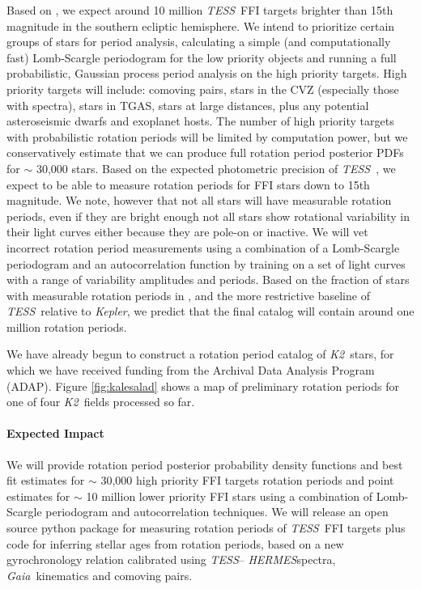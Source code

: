 \documentclass[letterpaper,12pt,preprint]{hack_aastex}
\newcommand{\Kepler}{{\it Kepler}}
\newcommand{\kepler}{\Kepler}
\newcommand{\Ktwo}{{\it K2}}
\newcommand{\ktwo}{\Ktwo}
\newcommand{\TESS}{{\it TESS}}
\newcommand{\tess}{{\it TESS}}
\newcommand{\Gaia}{{\it Gaia}}
\newcommand{\HERMES}{{\it HERMES}}
\begin{document}
Based on \citet{sullivan2015}, we expect around 10 million \TESS\ FFI
targets brighter than 15th magnitude in the southern ecliptic hemisphere.
We intend to prioritize certain groups of stars for period analysis,
calculating a simple (and computationally fast) Lomb-Scargle periodogram for
the low priority objects and running a full probabilistic, Gaussian process
period analysis on the high priority targets.
High priority targets will include: comoving pairs, stars in the CVZ
(especially those with spectra), stars in TGAS, stars at large distances, plus
any potential asteroseismic dwarfs and exoplanet hosts.
The number of high priority targets with probabilistic rotation periods will
be limited by computation power, but we conservatively estimate that we can
produce full rotation period posterior PDFs for $\sim$ 30,000 stars.
Based on the expected photometric precision of \tess\ \citep{sullivan2015}, we
expect to be able to measure rotation periods for FFI stars down to 15th
magnitude.
We note, however that not all stars will have measurable rotation periods,
even if they are bright enough not all stars show rotational variability in
their light curves either because they are pole-on or inactive.
We will vet incorrect rotation period measurements using a combination of a
Lomb-Scargle periodogram and an autocorrelation function by
training on a set of light curves with a range of variability amplitudes and
periods.
Based on the fraction of stars with measurable rotation periods in
\citet{mcquillan2014}, and the more restrictive baseline of \tess\ relative to
\kepler, we predict that the final catalog will contain around one million
rotation periods.

We have already begun to construct a rotation period catalog of \ktwo\ stars,
for which we have received funding from the Archival Data Analysis Program
(ADAP).
Figure \ref{fig:kalesalad} shows a map of preliminary rotation periods for one
of four \ktwo\ fields processed so far.


\paragraph{Expected Impact}
We will provide rotation period posterior probability density functions and
best fit estimates for $\sim$ 30,000 high priority FFI targets rotation
periods and point estimates for $\sim$ 10 million lower priority FFI stars
using a combination of Lomb-Scargle periodogram and autocorrelation
techniques.
We will release an open source python package for measuring rotation periods
of \tess\ FFI targets plus code for inferring stellar ages from rotation
periods, based on a new gyrochronology relation calibrated using \TESS --
\HERMES spectra, \Gaia\ kinematics and comoving pairs.
\end{document}
